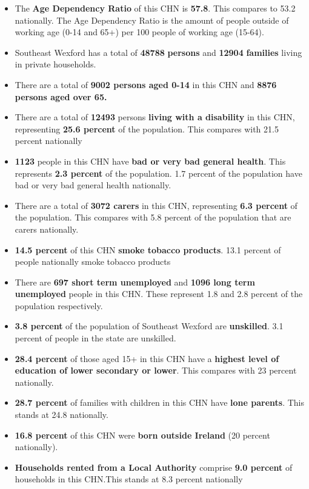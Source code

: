 \documentclass{article}
\begin{document}
\begin{itemize}

\item The \textbf{Age Dependency Ratio} of this CHN is  \textbf{57.8}. This compares to 53.2 nationally. The Age Dependency Ratio is the amount of people outside of working age (0-14 and 65+) per 100 people of working age (15-64). 

\item Southeast Wexford has a total of \textbf{\num{48788}} \textbf{persons} and  \textbf{\num{12904}} \textbf{families} living in private households.

\item There are a total of \textbf{\num{9002} persons aged 0-14} in this CHN and \textbf{\num{8876} persons aged over 65.} 

\item There are a total of \textbf{\num{12493}} persons \textbf{living with a disability} in this CHN, representing \textbf{25.6 percent} of the population. This compares with  21.5 percent nationally

\item \textbf{\num{1123}} people in this CHN have \textbf{bad or very bad general health}. This represents \textbf{2.3 percent} of the population. 1.7 percent of the population have bad or very bad general health nationally. 

\item There are a total of \textbf{\num{3072} carers} in this CHN, representing \textbf{6.3 percent} of the population. This compares with 5.8 percent of the population that are carers nationally. 

\item \textbf{14.5 percent} of this CHN \textbf{smoke tobacco products}. 13.1 percent of people nationally smoke tobacco products

\item There are \textbf{\num{697} short term unemployed} and \textbf{\num{1096} long term unemployed} people in this CHN. These represent 1.8 and 2.8 percent of the population respectively.

\item  \textbf{3.8 percent} of the population of Southeast Wexford are \textbf{unskilled}. 3.1 percent of people in the state are unskilled.

\item \textbf{28.4 percent} of those aged 15+ in this CHN have a \textbf{highest level of education of lower secondary or lower}. This compares with 23 percent nationally. 

\item \textbf{28.7 percent} of families with children in this CHN have \textbf{lone parents}. This stands at 24.8 nationally.

\item \textbf{16.8 percent} of this CHN were \textbf{born outside Ireland} (20 percent nationally).

\item \textbf{Households rented from a Local Authority} comprise \textbf{9.0 percent} of households in this CHN.This stands at 8.3 percent nationally

\end{itemize}
\end{document}
